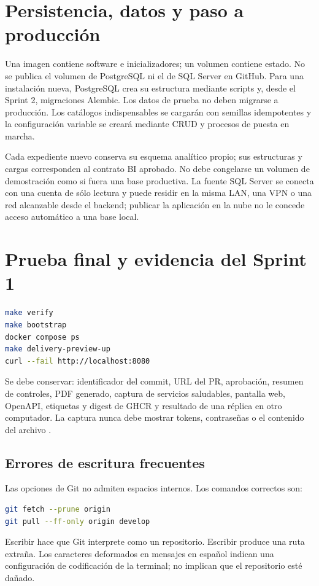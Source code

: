 \section{Persistencia, datos y paso a producción}

Una imagen contiene software e inicializadores; un volumen contiene estado. No se publica el volumen de PostgreSQL ni el de SQL Server en GitHub. Para una instalación nueva, PostgreSQL crea su estructura mediante scripts y, desde el Sprint 2, migraciones Alembic. Los datos de prueba no deben migrarse a producción. Los catálogos indispensables se cargarán con semillas idempotentes y la configuración variable se creará mediante CRUD y procesos de puesta en marcha.

Cada expediente nuevo conserva su esquema analítico propio; sus estructuras y cargas corresponden al contrato BI aprobado. No debe congelarse un volumen de demostración como si fuera una base productiva. La fuente SQL Server se conecta con una cuenta de sólo lectura y puede residir en la misma LAN, una VPN o una red alcanzable desde el backend; publicar la aplicación en la nube no le concede acceso automático a una base local.

\section{Prueba final y evidencia del Sprint 1}

\begin{lstlisting}[style=terminal,language=bash]
make verify
make bootstrap
docker compose ps
make delivery-preview-up
curl --fail http://localhost:8080
\end{lstlisting}

Se debe conservar: identificador del commit, URL del PR, aprobación, resumen de controles, PDF generado, captura de servicios saludables, pantalla web, OpenAPI, etiquetas y digest de GHCR y resultado de una réplica en otro computador. La captura nunca debe mostrar tokens, contraseñas o el contenido del archivo .

\subsection{Errores de escritura frecuentes}

Las opciones de Git no admiten espacios internos. Los comandos correctos son:

\begin{lstlisting}[style=terminal,language=bash]
git fetch --prune origin
git pull --ff-only origin develop
\end{lstlisting}

Escribir  hace que Git interprete  como un repositorio. Escribir  produce una ruta extraña. Los caracteres deformados en mensajes en español indican una configuración de codificación de la terminal; no implican que el repositorio esté dañado.
